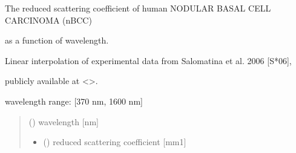 \documentclass[letterpaper,10pt,english]{sphinxmanual}
\begin{document}
\begin{fulllineitems}
\label{\detokenize{04_scattering_coefficient:skinoptics.scattering_coefficient.rmus_nBCC_Salomatina}}
\pysigstartsignatures
{}
\pysigstopsignatures
\begin{DUlineblock}{0em}
\item[] The reduced scattering coefficient of human NODULAR BASAL CELL CARCINOMA (nBCC)
\item[] as a function of wavelength.
\item[] Linear interpolation of experimental data from Salomatina et al. 2006 {[}S*06{]},
\item[] publicly available at \textless{}\textgreater{}.
\end{DUlineblock}

\begin{DUlineblock}{0em}
\item[] wavelength range: {[}370 nm, 1600 nm{]}
\end{DUlineblock}
\begin{quote}\begin{description}
\sphinxAtStartPar
{} () \textendash{} wavelength {[}nm{]}

\sphinxAtStartPar
\begin{itemize}
\item {} 
\sphinxAtStartPar
{} () \textendash{} reduced scattering coefficient {[}mm\sphinxhyphen{}1{]}

\end{itemize}


\end{description}\end{quote}

\end{fulllineitems}

\end{document}
